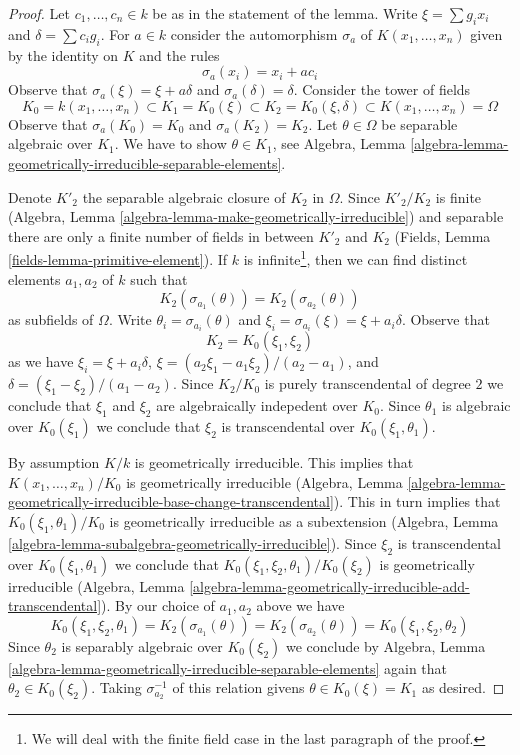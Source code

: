 \begin{proof}
Let $c_1, \ldots, c_n \in k$ be as in the statement of the lemma.
Write $\xi = \sum g_ix_i$ and $\delta = \sum c_ig_i$.
For $a \in k$ consider the automorphism $\sigma_a$
of $K(x_1, \ldots, x_n)$ given by the identity on $K$ and the rules
$$
\sigma_a(x_i) = x_i + a c_i
$$
Observe that $\sigma_a(\xi) = \xi + a \delta$ and $\sigma_a(\delta) = \delta$.
Consider the tower of fields
$$
K_0 = k(x_1, \ldots, x_n) \subset
K_1 = K_0(\xi) \subset
K_2 = K_0(\xi, \delta) \subset K(x_1, \ldots, x_n) = \Omega
$$
Observe that $\sigma_a(K_0) = K_0$ and $\sigma_a(K_2) = K_2$.
Let $\theta \in \Omega$ be separable algebraic over $K_1$.
We have to show $\theta \in K_1$, see Algebra, Lemma
\ref{algebra-lemma-geometrically-irreducible-separable-elements}.

\medskip\noindent
Denote $K'_2$ the separable algebraic closure of $K_2$ in $\Omega$.
Since $K'_2/K_2$ is finite (Algebra, Lemma
\ref{algebra-lemma-make-geometrically-irreducible}) and
separable there are only a finite number of fields in
between $K'_2$ and $K_2$ (Fields, Lemma \ref{fields-lemma-primitive-element}).
If $k$ is infinite\footnote{We will deal with the finite field case in the
last paragraph of the proof.}, then we can find distinct elements
$a_1, a_2$ of $k$ such that
$$
K_2(\sigma_{a_1}(\theta)) = K_2(\sigma_{a_2}(\theta))
$$
as subfields of $\Omega$. Write $\theta_i = \sigma_{a_i}(\theta)$
and $\xi_i = \sigma_{a_i}(\xi) = \xi + a_i \delta$. Observe that
$$
K_2 = K_0(\xi_1, \xi_2)
$$
as we have $\xi_i = \xi + a_i \delta$,
$\xi = (a_2 \xi_1 - a_1 \xi_2)/(a_2 - a_1)$, and
$\delta = (\xi_1 - \xi_2)/(a_1 - a_2)$.
Since $K_2/K_0$ is purely transcendental of degree $2$ we conclude
that $\xi_1$ and $\xi_2$ are algebraically indepedent over $K_0$.
Since $\theta_1$ is algebraic over $K_0(\xi_1)$ we conclude that
$\xi_2$ is transcendental over $K_0(\xi_1, \theta_1)$.

\medskip\noindent
By assumption $K/k$ is geometrically irreducible. This implies
that $K(x_1, \ldots, x_n)/K_0$ is geometrically irreducible
(Algebra, Lemma
\ref{algebra-lemma-geometrically-irreducible-base-change-transcendental}).
This in turn implies that $K_0(\xi_1, \theta_1)/K_0$
is geometrically irreducible as a subextension
(Algebra, Lemma \ref{algebra-lemma-subalgebra-geometrically-irreducible}).
Since $\xi_2$ is transcendental over $K_0(\xi_1, \theta_1)$
we conclude that $K_0(\xi_1, \xi_2, \theta_1)/K_0(\xi_2)$
is geometrically irreducible (Algebra, Lemma
\ref{algebra-lemma-geometrically-irreducible-add-transcendental}).
By our choice of $a_1, a_2$ above we have
$$
K_0(\xi_1, \xi_2, \theta_1) =
K_2(\sigma_{a_1}(\theta)) =
K_2(\sigma_{a_2}(\theta)) =
K_0(\xi_1, \xi_2, \theta_2)
$$
Since $\theta_2$ is separably algebraic over $K_0(\xi_2)$
we conclude by Algebra, Lemma
\ref{algebra-lemma-geometrically-irreducible-separable-elements} again that
$\theta_2 \in K_0(\xi_2)$. Taking $\sigma_{a_2}^{-1}$
of this relation givens $\theta \in K_0(\xi) = K_1$ as desired.


\end{proof}
